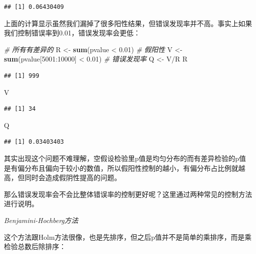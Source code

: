 \documentclass[]{tufte-book}
\newenvironment{Shaded}{}{}
\newcommand{\CommentTok}[1]{\textcolor[rgb]{0.38,0.63,0.69}{\textit{#1}}}
\newcommand{\DecValTok}[1]{\textcolor[rgb]{0.25,0.63,0.44}{#1}}
\newcommand{\FloatTok}[1]{\textcolor[rgb]{0.25,0.63,0.44}{#1}}
\newcommand{\KeywordTok}[1]{\textcolor[rgb]{0.00,0.44,0.13}{\textbf{#1}}}
\newcommand{\NormalTok}[1]{#1}
\newcommand{\OperatorTok}[1]{\textcolor[rgb]{0.40,0.40,0.40}{#1}}
\newcommand{\StringTok}[1]{\textcolor[rgb]{0.25,0.44,0.63}{#1}}
\begin{document}
\begin{verbatim}
## [1] 0.06430409
\end{verbatim}

上面的计算显示虽然我们漏掉了很多阳性结果，但错误发现率并不高。事实上如果我们控制错误率到0.01，错误发现率会更低：

\begin{Shaded}
\begin{Highlighting}[]
\CommentTok{# 所有有差异的}
\NormalTok{R <-}\StringTok{ }\KeywordTok{sum}\NormalTok{(pvalue }\OperatorTok{<}\StringTok{ }\FloatTok{0.01}\NormalTok{)}
\CommentTok{# 假阳性}
\NormalTok{V <-}\StringTok{ }\KeywordTok{sum}\NormalTok{(pvalue[}\DecValTok{5001}\OperatorTok{:}\DecValTok{10000}\NormalTok{] }\OperatorTok{<}\StringTok{ }\FloatTok{0.01}\NormalTok{)}
\CommentTok{# 错误发现率}
\NormalTok{Q <-}\StringTok{ }\NormalTok{V}\OperatorTok{/}\NormalTok{R}
\NormalTok{R}
\end{Highlighting}
\end{Shaded}

\begin{verbatim}
## [1] 999
\end{verbatim}

\begin{Shaded}
\begin{Highlighting}[]
\NormalTok{V}
\end{Highlighting}
\end{Shaded}

\begin{verbatim}
## [1] 34
\end{verbatim}

\begin{Shaded}
\begin{Highlighting}[]
\NormalTok{Q}
\end{Highlighting}
\end{Shaded}

\begin{verbatim}
## [1] 0.03403403
\end{verbatim}

其实出现这个问题不难理解，空假设检验里p值是均匀分布的而有差异检验的p值是有偏分布且偏向于较小的数值，所以假阳性控制的越小，有偏分布占比例就越高，但同时会造成假阴性提高的问题。

那么错误发现率会不会比整体错误率的控制更好呢？这里通过两种常见的控制方法进行说明。

\emph{Benjamini-Hochberg方法}

这个方法跟Holm方法很像，也是先排序，但之后p值并不是简单的乘排序，而是乘检验总数后除排序：
\end{document}
